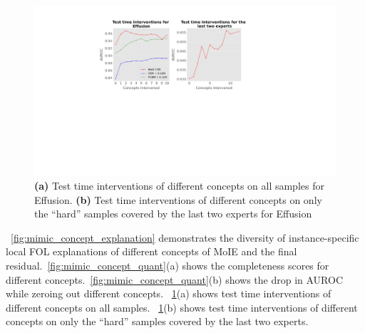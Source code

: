 \begin{figure}[h]
\centering
\includegraphics[width=1.0\textwidth]
{figures/Supp/mimic_concept_tti.pdf}
\caption{\textbf{(a)} Test time interventions of different concepts on all samples for Effusion.
\textbf{(b)} Test time interventions of different concepts on only the ``hard'' samples covered by the last two experts for Effusion}
\label{fig:mimic_concept_tti}
\end{figure}

~\cref{fig:mimic_concept_explanation} demonstrates the diversity of instance-specific local FOL explanations of different concepts of MoIE and the final residual.~\cref{fig:mimic_concept_quant}(a) shows the completeness scores for different concepts.~\cref{fig:mimic_concept_quant}(b) shows the drop in AUROC while zeroing out different concepts. ~\cref{fig:mimic_concept_tti}(a) shows test time interventions of different concepts on all samples. ~\cref{fig:mimic_concept_tti}(b) shows test time interventions of different concepts on only the ``hard'' samples covered by the last two experts.



